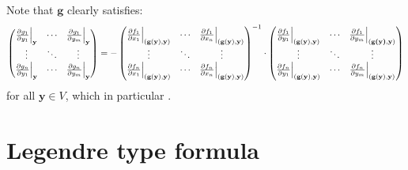 \documentclass{report}
\begin{document}
Note that $\textbf{g}$ clearly satisfies:
    \begin{align*}
\begin{pmatrix} 
  \frac{\partial g_1}{\partial y_1} \Big|_{\textbf{y}} & \cdots & \frac{\partial g_1}{\partial y_m} \Big|_{\textbf{y}} \\
  \vdots & \ddots & \vdots \\
  \frac{\partial g_n}{\partial y_1} \Big|_{\textbf{y}} & \cdots & \frac{\partial g_n}{\partial y_m} \Big|_{\textbf{y}}
\end{pmatrix} = -  
\begin{pmatrix} 
  \frac{\partial f_1}{\partial x_1} \Big  |_{(\textbf{g}(\textbf{y}),\textbf{y})} & \cdots & \frac{\partial f_1}{\partial x_n} \Big |_{(\textbf{g}(\textbf{y}),\textbf{y})}  \\
  \vdots & \ddots & \vdots \\
  \frac{\partial f_n}{\partial x_1} \Big|_{(\textbf{g}(\textbf{y}),\textbf{y})} & \cdots & \frac{\partial f_n}{\partial x_n} \Big  |_{(\textbf{g}(\textbf{y}),\textbf{y})} 
\end{pmatrix}^{-1} \cdot \begin{pmatrix} 
  \frac{\partial f_1}{\partial y_1} \Big|_{(\textbf{g}(\textbf{y}),\textbf{y})} & \cdots & \frac{\partial f_1}{\partial y_m}  \Big |_{(\textbf{g(\textbf{y})},\textbf{y})} \\
  \vdots & \ddots & \vdots \\
  \frac{\partial f_n}{\partial y_1} \Big|_{(\textbf{g}(\textbf{y}),\textbf{y})} & \cdots & \frac{\partial f_n}{\partial y_m}  \Big |_{(\textbf{g}(\textbf{y}),\textbf{y})} 
\end{pmatrix}
\end{align*}
for all $\textbf{y} \in V$, which in particular . 
\section{Legendre type formula}
\end{document}
